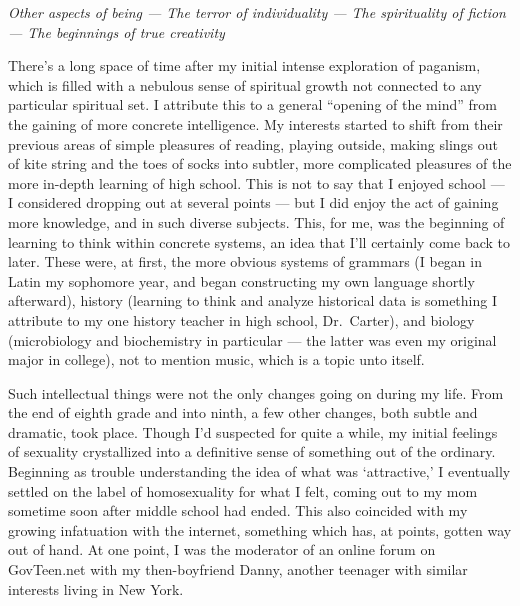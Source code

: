 \emph{Other aspects of being --- The terror of individuality --- The spirituality of fiction --- The beginnings of true creativity}

There's a long space of time after my initial intense exploration of paganism, which is filled with a nebulous sense of spiritual growth not connected to any particular spiritual set. I attribute this to a general ``opening of the mind'' from the gaining of more concrete intelligence. My interests started to shift from their previous areas of simple pleasures of reading, playing outside, making slings out of kite string and the toes of socks into subtler, more complicated pleasures of the more in-depth learning of high school. This is not to say that I enjoyed school --- I considered dropping out at several points --- but I did enjoy the act of gaining more knowledge, and in such diverse subjects. This, for me, was the beginning of learning to think within concrete systems, an idea that I'll certainly come back to later. These were, at first, the more obvious systems of grammars (I began in Latin my sophomore year, and began constructing my own language shortly afterward), history (learning to think and analyze historical data is something I attribute to my one history teacher in high school, Dr.~Carter), and biology (microbiology and biochemistry in particular --- the latter was even my original major in college), not to mention music, which is a topic unto itself.

Such intellectual things were not the only changes going on during my life. From the end of eighth grade and into ninth, a few other changes, both subtle and dramatic, took place. Though I'd suspected for quite a while, my initial feelings of sexuality crystallized into a definitive sense of something out of the ordinary. Beginning as trouble understanding the idea of what was `attractive,' I eventually settled on the label of homosexuality for what I felt, coming out to my mom sometime soon after middle school had ended. This also coincided with my growing infatuation with the internet, something which has, at points, gotten way out of hand. At one point, I was the moderator of an online forum on GovTeen.net with my then-boyfriend Danny, another teenager with similar interests living in New York.

